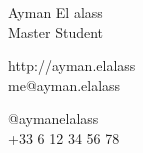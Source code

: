 \documentclass{article}
\begin{document}
\parbox{2in}{\Large \centering Ayman El alass\\[1pt]
\normalsize Master Student}

\vfill
\raggedright
\begin{multicols}{2}
http://ayman.elalass\\
me@ayman.elalass

\columnbreak
\raggedleft
@aymanelalass\\
+33 6 12 34 56 78%
\end{multicols}%
\end{document}
